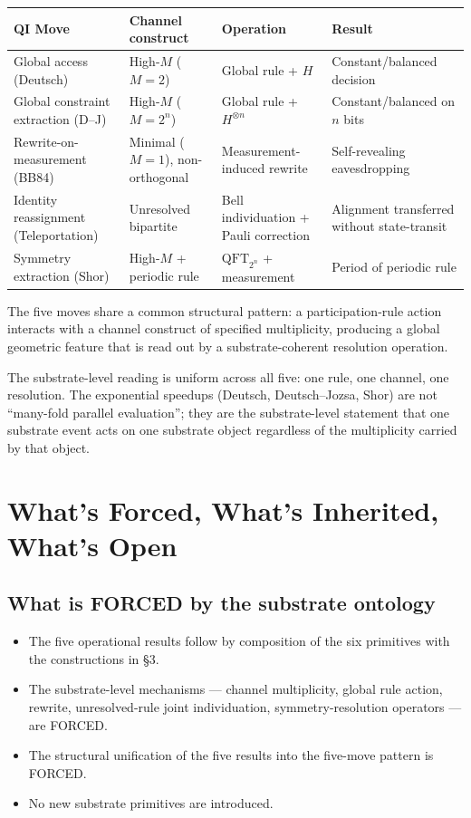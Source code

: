 \documentclass[11pt,a4paper]{article}
\begin{document}
\begin{center}
\footnotesize
\begin{tabular}{@{}p{3.4cm}p{3.4cm}p{3.4cm}p{4.4cm}@{}}
\toprule
QI Move & Channel construct & Operation & Result \\
\midrule
Global access (Deutsch) & High-$M$ ($M = 2$) & Global rule + $H$ & Constant/balanced decision \\
Global constraint extraction (D--J) & High-$M$ ($M = 2^n$) & Global rule + $H^{\otimes n}$ & Constant/balanced on $n$ bits \\
Rewrite-on-measurement (BB84) & Minimal ($M = 1$), non-orthogonal & Measurement-induced rewrite & Self-revealing eavesdropping \\
Identity reassignment (Teleportation) & Unresolved bipartite & Bell individuation + Pauli correction & Alignment transferred without state-transit \\
Symmetry extraction (Shor) & High-$M$ + periodic rule & $\mathrm{QFT}_{2^n}$ + measurement & Period of periodic rule \\
\bottomrule
\end{tabular}
\end{center}

The five moves share a common structural pattern: a participation-rule action interacts with a channel construct of specified multiplicity, producing a global geometric feature that is read out by a substrate-coherent resolution operation.

The substrate-level reading is uniform across all five: one rule, one channel, one resolution. The exponential speedups (Deutsch, Deutsch--Jozsa, Shor) are not ``many-fold parallel evaluation''; they are the substrate-level statement that one substrate event acts on one substrate object regardless of the multiplicity carried by that object.

\section{What's Forced, What's Inherited, What's Open}

\subsection*{What is FORCED by the substrate ontology}

\begin{itemize}[noitemsep]
  \item The five operational results follow by composition of the six primitives with the constructions in \S3.
  \item The substrate-level mechanisms --- channel multiplicity, global rule action, rewrite, unresolved-rule joint individuation, symmetry-resolution operators --- are FORCED.
  \item The structural unification of the five results into the five-move pattern is FORCED.
  \item No new substrate primitives are introduced.
\end{itemize}
\end{document}
